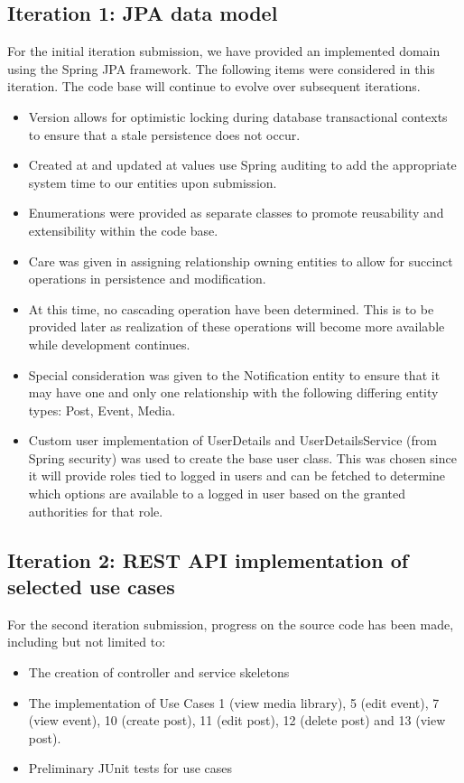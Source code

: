 \subsection{Iteration 1: JPA data model}
For the initial iteration submission, we have provided an implemented domain using the
Spring JPA framework. The following items were considered in this iteration. The code base will continue to evolve over subsequent iterations.
\begin{itemize}
    \item Version allows for optimistic locking during database transactional contexts to ensure that a stale persistence does not occur.

    \item Created at and updated at values use Spring auditing to add the appropriate system time to our entities upon submission.

    \item Enumerations were provided as separate classes to promote reusability and extensibility within the code base.

    \item Care was given in assigning relationship owning entities to allow for succinct operations in persistence and modification.

    \item At this time, no cascading operation have been determined. This is to be provided later as realization of these operations will become more available while development continues.

    \item Special consideration was given to the Notification entity to ensure that it may have one and only one relationship with the following differing entity types: Post, Event, Media.

    \item Custom user implementation of UserDetails and UserDetailsService (from Spring security) was used to create the base user class. This was chosen since it will provide roles tied to logged in users and can be fetched to determine which options are available to a logged in user based on the granted authorities for that role.
\end{itemize}

\subsection{Iteration 2: REST API implementation of selected use cases}
For the second iteration submission, progress on the source code has been made, including but not limited to:
\begin{itemize}
    \item The creation of controller and service skeletons
    \item The implementation of Use Cases 1 (view media library), 5 (edit event), 7 (view event), 10 (create post), 11 (edit post), 12 (delete post) and 13 (view post).
    \item Preliminary JUnit tests for use cases
\end{itemize}


